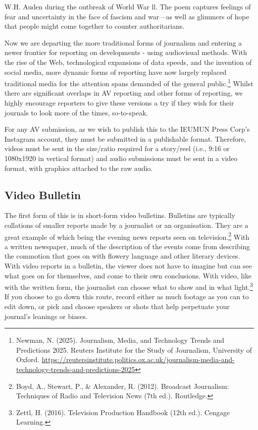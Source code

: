 W.H. Auden during the outbreak of World War ll. The poem captures feelings of fear and uncertainty in the face of fascism and war—as well as glimmers of hope that people might come together to counter authoritarians.

Now we are departing the more traditional forms of journalism and entering a newer frontier for reporting on developments - using audiovisual methods. With the rise of the Web, technological expansions of data speeds, and the invention of social media, more dynamic forms of reporting have now largely replaced traditional media for the attention spans demanded of the general public.\footnote{Newman, N. (2025). Journalism, Media, and Technology Trends and Predictions 2025. Reuters Institute for the Study of Journalism, University of Oxford. \url{https://reutersinstitute.politics.ox.ac.uk/journalism-media-and-technology-trends-and-predictions-2025}} Whilst there are significant overlaps in AV reporting and other forms of reporting, we highly encourage reporters to give these versions a try if they wish for their journals to look more of the times, so-to-speak.

For any AV submission, as we wish to publish this to the IEUMUN Press Corp’s Instagram account, they must be submitted in a publishable format. Therefore, videos must be sent in the size/ratio required for a story/reel (i.e., 9:16 or 1080x1920 in vertical format) and audio submissions must be sent in a video format, with graphics attached to the raw audio.

\subsection{Video Bulletin}

The first form of this is in short-form video bulletins. Bulletins are typically collations of smaller reports made by a journalist or an organisation. They are a great example of which being the evening news reports seen on television.\footnote{Boyd, A., Stewart, P., \& Alexander, R. (2012). Broadcast Journalism: Techniques of Radio and Television News (7th ed.). Routledge.} With a written newspaper, much of the description of the events come from describing the commotion that goes on with flowery language and other literary devices. With video reports in a bulletin, the viewer does not have to imagine but can see what goes on for themselves, and come to their own conclusions. With video, like with the written form, the journalist can choose what to show and in what light.\footnote{Zettl, H. (2016). Television Production Handbook (12th ed.). Cengage Learning.} If you choose to go down this route, record either as much footage as you can to edit down, or pick and choose speakers or shots that help perpetuate your journal’s leanings or biases.

